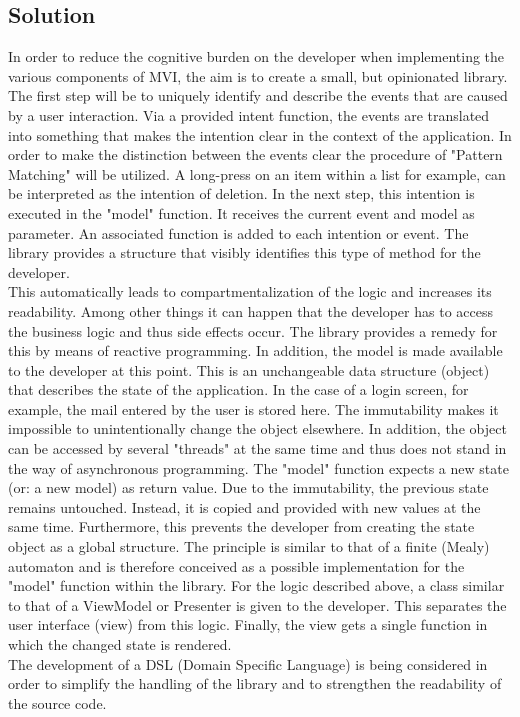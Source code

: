 \subsection{Solution}
\label{subsec:solution}


In order to reduce the cognitive burden on the developer when implementing the various components of MVI, the aim 
is to create a small, but opinionated library.
\\
The first step will be to uniquely identify and describe the events that are caused by a user interaction.
Via a provided intent function, the events are translated into something that makes the intention clear in the context of the application.
In order to make the distinction between the events clear the procedure of "Pattern Matching" will be utilized. A long-press on an item within a list for example, 
can be interpreted as the intention of deletion. In the next step, this intention is executed in the "model" function. It receives the current event and model 
as parameter. An associated function is added to each intention or event. The library provides a structure that visibly identifies this type of method for the developer.
\\
This automatically leads to compartmentalization of the logic and increases its readability. Among other things it can happen that the developer has to access the business 
logic and thus side effects occur. The library provides a remedy for this by means of reactive programming. In addition, the model is made available to the developer
at this point. This is an unchangeable data structure (object) that describes the state of the application. In the case of a login screen, for example, the mail 
entered by the user is stored here. The immutability makes it impossible to unintentionally change the object elsewhere. In addition, the object can be accessed 
by several "threads" at the same time and thus does not stand in the way of asynchronous programming. The "model" function expects a new state (or: a new model) 
as return value. Due to the immutability, the previous state remains untouched. Instead, it is copied and provided with new values at the same time. Furthermore, 
this prevents the developer from creating the state object as a global structure. The principle is similar to that of a finite (Mealy) automaton and is therefore 
conceived as a possible implementation for the "model" function within the library. For the logic described above, a class similar to that of a ViewModel or Presenter 
is given to the developer. This separates the user interface (view) from this logic. Finally, the view gets a single function in which the changed state is rendered.
\\
The development of a DSL (Domain Specific Language) is being considered in order to simplify the handling of the library and to strengthen the readability 
of the source code.



